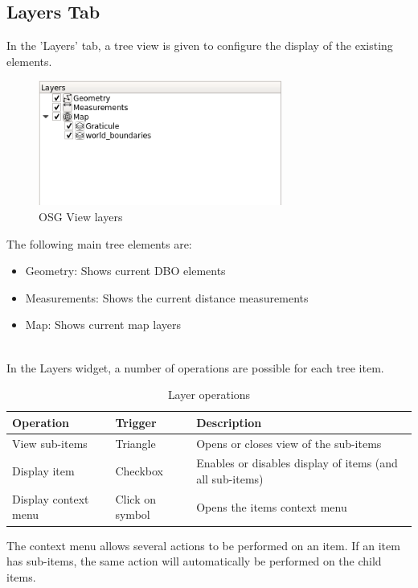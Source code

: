 \subsection{Layers Tab}

In the 'Layers' tab, a tree view is given to configure the display of the existing elements. 

\begin{figure}[H]
    \includegraphics[width=8cm,frame]{../screenshots/osgview_layers.png}
  \caption{OSG View layers}
\end{figure}

The following main tree elements are:\\

\begin{itemize}
 \item Geometry: Shows current DBO elements
 \item Measurements: Shows the current distance measurements
 \item Map: Shows current map layers
\end{itemize} 
 \ \\

In the Layers widget, a number of operations are possible for each tree item.

\begin{table}[H]
  \center
  \begin{tabular}{ | l | l | l |}
    \hline
    \textbf{Operation} & \textbf{Trigger} &  \textbf{Description} \\ \hline
    View sub-items & Triangle & Opens or closes view of the sub-items \\ \hline
    Display item & Checkbox & Enables or disables display of items (and all sub-items) \\ \hline
    Display context menu & Click on symbol & Opens the items context menu \\ \hline
  \end{tabular}
  \caption{Layer operations}
\end{table}

The context menu allows several actions to be performed on an item. If an item has sub-items, the same action will automatically be performed on the child items.







